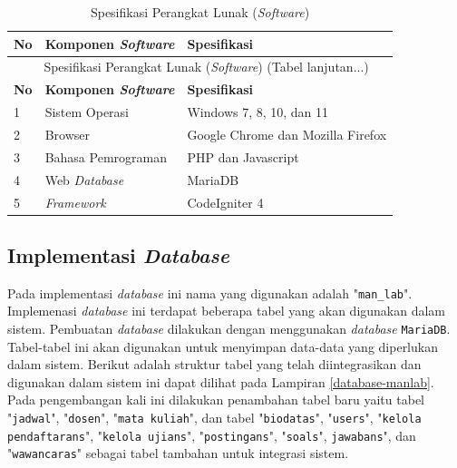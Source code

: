 	{
		\fontsize{10}{13}\selectfont
		\begin{longtable}{p{0.5cm} p{4.9cm} p{7.4cm}}
			\caption{Spesifikasi Perangkat Lunak (\textit{Software})}                                                                                     \\
			\hline
			\textbf{No} & \textbf{Komponen \textit{Software}} & \textbf{Spesifikasi}                                                                      \\
			\hline
			\endfirsthead

			\multicolumn{3}{c}{\normalsize\tablename\ \textbf{\thetable}\ {{Spesifikasi Perangkat Lunak (\textit{Software}) \space (Tabel lanjutan...)}}} \\
			\hline
			\textbf{No} & \textbf{Komponen \textit{Software}} & \textbf{Spesifikasi}                                                                      \\
			\hline
			\endhead

			\hline
			\endfoot

			1           & Sistem Operasi                      & Windows 7, 8, 10, dan 11                                                                  \\
			2           & Browser                             & Google Chrome dan Mozilla Firefox                                                         \\
			3           & Bahasa Pemrograman                  & PHP dan Javascript                                                                        \\
			4           & Web \textit{Database}               & MariaDB                                                                                   \\
			5           & \textit{Framework}                  & CodeIgniter 4                                                                             \\
			\hline
		\end{longtable}
	}

\subsection{Implementasi \textit{Database}}
Pada implementasi \textit{database} ini nama yang digunakan adalah "\texttt{man\_lab}". Implemenasi \textit{database} ini terdapat beberapa tabel yang akan digunakan dalam sistem. Pembuatan \textit{database} dilakukan dengan menggunakan \textit{database} \texttt{MariaDB}. Tabel-tabel ini akan digunakan untuk menyimpan data-data yang diperlukan dalam sistem. Berikut adalah struktur tabel yang telah diintegrasikan dan digunakan dalam sistem ini dapat dilihat pada Lampiran \ref{database-manlab}. Pada pengembangan kali ini dilakukan penambahan tabel baru yaitu tabel "\texttt{jadwal}", "\texttt{dosen}", "\texttt{mata kuliah}", dan tabel  "\texttt{biodatas}", "\texttt{users}", "\texttt{kelola pendaftarans}", "\texttt{kelola ujians}", "\texttt{postingans}", "\texttt{soals}", \texttt{jawabans}", dan "\texttt{wawancaras}" sebagai tabel tambahan untuk integrasi sistem.


